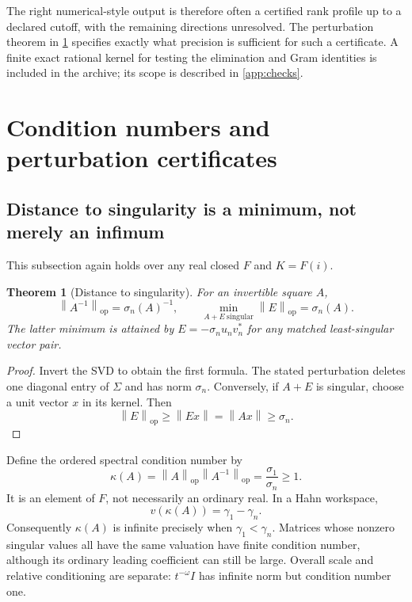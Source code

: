 \documentclass[11pt,a4paper]{article}
\numberwithin{equation}{section}
\newtheorem{theorem}{Theorem}[section]
\theoremstyle{definition}
\theoremstyle{remark}
\newcommand{\op}{\mathrm{op}}
\newcommand{\norm}[1]{\left\lVert#1\right\rVert}
\begin{document}
The right numerical-style output is therefore often a certified rank
profile up to a declared cutoff, with the remaining directions unresolved.
The perturbation theorem in \cref{sec:conditioning} specifies exactly what
precision is sufficient for such a certificate. A finite exact rational
kernel for testing the elimination and Gram identities is included in the
archive; its scope is described in \cref{app:checks}.

\section{Condition numbers and perturbation certificates}\label{sec:conditioning}

\subsection{Distance to singularity is a minimum, not merely an infimum}
This subsection again holds over any real closed $F$ and $K=F(i)$.

\begin{theorem}[Distance to singularity]\label{thm:distance}
For an invertible square $A$,
\begin{equation}\label{eq:dist}
 \norm{A^{-1}}_{\op}=\sigma_n(A)^{-1},\qquad
 \min_{A+E\ \mathrm{singular}}\norm E_{\op}=\sigma_n(A).
\end{equation}
The latter minimum is attained by
$E=-\sigma_nu_nv_n^*$ for any matched least-singular vector pair.
\end{theorem}
\begin{proof}
Invert the SVD to obtain the first formula. The stated perturbation deletes
one diagonal entry of $\Sigma$ and has norm $\sigma_n$. Conversely, if
$A+E$ is singular, choose a unit vector $x$ in its kernel. Then
\[
 \norm E_{\op}\ge\norm{Ex}=\norm{Ax}\ge\sigma_n.
\]
\end{proof}

Define the ordered spectral condition number by
\[
 \kappa(A)=\norm A_{\op}\norm{A^{-1}}_{\op}
          =\frac{\sigma_1}{\sigma_n}\ge1.
\]
It is an element of $F$, not necessarily an ordinary real. In a Hahn
workspace,
\begin{equation}\label{eq:kappaval}
 v(\kappa(A))=\gamma_1-\gamma_n.
\end{equation}
Consequently $\kappa(A)$ is infinite precisely when
$\gamma_1<\gamma_n$. Matrices whose nonzero singular values all have the
same valuation have finite condition number, although its ordinary leading
coefficient can still be large. Overall scale and relative conditioning are
separate: $t^{-\omega}I$ has infinite norm but condition number one.
\end{document}
